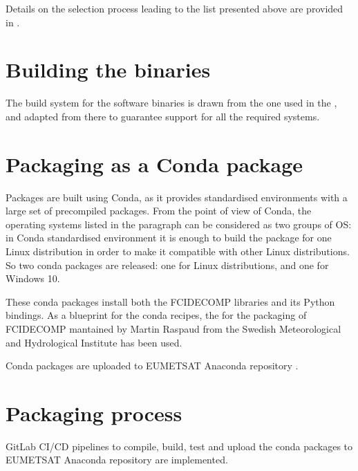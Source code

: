 \documentclass[a4paper,10pt,english]{sphinxmanual}
\begin{document}
\sphinxAtStartPar
Details on the selection process leading to the list presented above are provided in
{\hyperref[\detokenize{a_design_justifications:design-justifications}]{}}.


\section{Building the binaries}
\label{\detokenize{packaging_and_deployment:building-the-binaries}}
\sphinxAtStartPar
The build system for the software binaries is drawn from the one used in the
{\hyperref[\detokenize{introduction:fcidecomp-latest}]{}}, and adapted from there to guarantee support for all the
required systems.


\section{Packaging as a Conda package}
\label{\detokenize{packaging_and_deployment:packaging-as-a-conda-package}}
\sphinxAtStartPar
Packages are built using Conda, as it provides standardised environments with a large set of pre\sphinxhyphen{}compiled packages.
From the point of view of Conda, the operating systems listed in the {\hyperref[\detokenize{packaging_and_deployment:supported-platforms}]{}} paragraph can be
considered as two groups of OS: in Conda standardised environment it is enough to build the package for one Linux
distribution in order to make it compatible with other Linux distributions. So two conda packages are released: one for
Linux distributions, and one for Windows 10.

\sphinxAtStartPar
These conda packages install both the FCIDECOMP libraries and its Python bindings. As a blueprint for the
conda recipes, the {\hyperref[\detokenize{introduction:fcidecomp-conda}]{}} for the packaging of FCIDECOMP mantained by Martin Raspaud
from the Swedish Meteorological and Hydrological Institute has been used.

\sphinxAtStartPar
Conda packages are uploaded to EUMETSAT Anaconda repository .


\section{Packaging process}
\label{\detokenize{packaging_and_deployment:packaging-process}}
\sphinxAtStartPar
GitLab CI/CD pipelines to compile, build, test and upload the conda packages to EUMETSAT Anaconda repository are
implemented.
\end{document}
